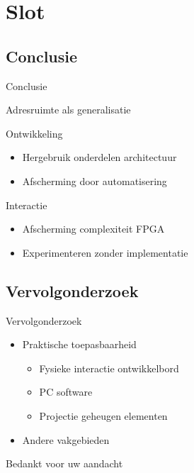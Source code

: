 \documentclass{beamer}
\begin{document}
\section{Slot}

\subsection{Conclusie}
\begin{frame}{Conclusie}

\begin{block}{Adresruimte als generalisatie}

\vspace{1em}

Ontwikkeling

\begin{itemize}
    \item Hergebruik onderdelen architectuur
    \item Afscherming door automatisering
\end{itemize}

\vspace{1em}

Interactie

\begin{itemize}
    \item Afscherming complexiteit FPGA
    \item Experimenteren zonder implementatie
\end{itemize}
\end{block}

\end{frame}

\subsection{Vervolgonderzoek}
\begin{frame}{Vervolgonderzoek}
\begin{itemize}
    \item Praktische toepasbaarheid
    \begin{itemize}
        \item Fysieke interactie ontwikkelbord
        \item PC software
        \item Projectie geheugen elementen
    \end{itemize}
    \vspace{1em}
    \item Andere vakgebieden
\end{itemize}
\end{frame}

\begin{frame}
    
    \begin{center}
    Bedankt voor uw aandacht
    \end{center}
    
\end{frame}
\end{document}
